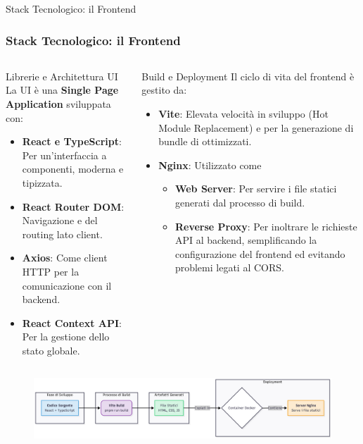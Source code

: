 \documentclass[8pt]{beamer}
\begin{document}
\begin{frame}{Stack Tecnologico: il Frontend}
  \frametitle{Stack Tecnologico: il Frontend}

  \begin{columns}[T]
    \begin{block}{Librerie e Architettura UI}
      La UI è una \textbf{Single Page Application} sviluppata con:
      \begin{itemize}
        \item[\large\faReact] \textbf{React e TypeScript}: Per un'interfaccia a componenti, moderna e tipizzata.

        \item[\large\faRoute]  \textbf{React Router DOM}: Navigazione e del routing lato client.

        \item[\large\faExchange*] \textbf{Axios}: Come client HTTP per la comunicazione con il backend.

        \item[\large\faCogs] \textbf{React Context API}: Per la gestione dello stato globale.
      \end{itemize}
    \end{block}

    \begin{block}{Build e Deployment}
      Il ciclo di vita del frontend è gestito da:
      \begin{itemize}
        \item[\large\faBolt] \textbf{Vite}: Elevata velocità in sviluppo (Hot Module Replacement) e per la generazione di bundle di ottimizzati.
        \item[\large\faServer] \textbf{Nginx}: Utilizzato come
              \begin{itemize}
                \item \textbf{Web Server}: Per servire i file statici generati dal processo di build.
                \item \textbf{Reverse Proxy}: Per inoltrare le richieste API al backend, semplificando la configurazione del frontend ed evitando problemi legati al CORS.
              \end{itemize}
      \end{itemize}
    \end{block}
  \end{columns}

  \vfill %

  \begin{figure}
    \centering
    \includegraphics[width=\textwidth]{figures/frontend_stack.png}
  \end{figure}

\end{frame}
\end{document}
